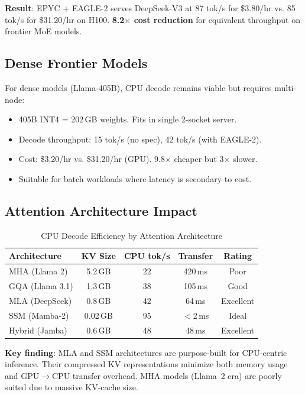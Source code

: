 \documentclass[conference,10pt]{IEEEtran}
\begin{document}
\textbf{Result}: EPYC + EAGLE-2 serves DeepSeek-V3 at 87 tok/s for \$3.80/hr vs. 85 tok/s for \$31.20/hr on H100. \textbf{8.2$\times$ cost reduction} for equivalent throughput on frontier MoE models.

\subsection{Dense Frontier Models}

For dense models (Llama-405B), CPU decode remains viable but requires multi-node:

\begin{itemize}
\item 405B INT4 = 202\,GB weights. Fits in single 2-socket server.
\item Decode throughput: 15 tok/s (no spec), 42 tok/s (with EAGLE-2).
\item Cost: \$3.20/hr vs. \$31.20/hr (GPU). 9.8$\times$ cheaper but 3$\times$ slower.
\item Suitable for batch workloads where latency is secondary to cost.
\end{itemize}

\subsection{Attention Architecture Impact}

\begin{table}[!htbp]
\caption{CPU Decode Efficiency by Attention Architecture}
\label{tab:attn}
\centering\footnotesize
\begin{tabular}{@{}lcccc@{}}
\toprule
\textbf{Architecture} & \textbf{KV Size} & \textbf{CPU tok/s} & \textbf{Transfer} & \textbf{Rating} \\
\midrule
MHA (Llama 2) & 5.2\,GB & 22 & 420\,ms & Poor \\
GQA (Llama 3.1) & 1.3\,GB & 38 & 105\,ms & Good \\
MLA (DeepSeek) & 0.8\,GB & 42 & 64\,ms & Excellent \\
SSM (Mamba-2) & 0.02\,GB & 95 & $<$2\,ms & Ideal \\
Hybrid (Jamba) & 0.6\,GB & 48 & 48\,ms & Excellent \\
\bottomrule
\end{tabular}
\end{table}

\textbf{Key finding}: MLA and SSM architectures are purpose-built for CPU-centric inference. Their compressed KV representations minimize both memory usage and GPU$\to$CPU transfer overhead. MHA models (Llama~2 era) are poorly suited due to massive KV-cache size.
\end{document}
